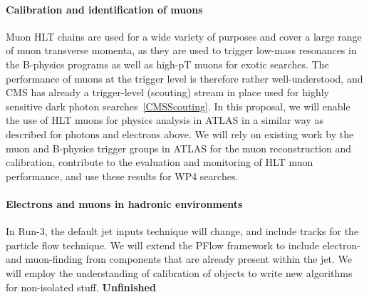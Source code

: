 \paragraph{Calibration and identification of muons} 

Muon HLT chains are used for a wide variety of purposes and cover a large range of muon transverse momenta, as they are used to trigger low-mass resonances in the B-physics programs as well as high-pT muons for exotic searches. 
The performance of muons at the trigger level is therefore rather well-understood, and CMS has already a trigger-level (scouting) stream in place used for highly sensitive dark photon searches~\ref{CMSScouting}. In this proposal, we will enable the use of HLT muons for physics analysis in ATLAS in a similar way as described for photons and electrons above. We will rely on existing work  by the muon and B-physics trigger groups in ATLAS for the muon reconstruction and calibration, contribute to the evaluation and monitoring of HLT muon performance, and use these results for WP4 searches. 

\paragraph{Electrons and muons in hadronic environments}

In Run-3, the default jet inputs technique will change, and include tracks for the particle flow technique. 
We will extend the PFlow framework to include electron- and muon-finding from components that are already present within the jet. 
We will employ the understanding of calibration of objects to write new algorithms for non-isolated stuff. 
\textbf{Unfinished}








